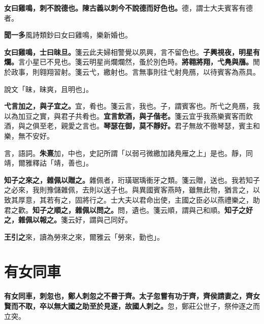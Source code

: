 
\textbf{女曰雞鳴，刺不說德也。陳古義以刺今不說德而好色也。}{\footnotesize 德，謂士大夫賓客有德者。}

\begin{quoting}\textbf{聞一多}風詩類鈔曰女曰雞鳴，樂新婚也。\end{quoting}

\textbf{女曰雞鳴，士曰昧旦。}{\footnotesize 箋云此夫婦相警覺以夙興，言不留色也。}\textbf{子興視夜，明星有爛。}{\footnotesize 言小星已不見也。箋云明星尚爛爛然，蚤於別色時。}\textbf{將翱將翔，弋鳧與鴈。}{\footnotesize 閒於政事，則翱翔習射。箋云弋，繳射也。言無事則往弋射鳧鴈，以待賓客為燕具。}

\begin{quoting}說文「昧，昧爽，且明也」。\end{quoting}

\textbf{弋言加之，與子宜之。}{\footnotesize 宜，肴也。箋云言，我也。子，謂賓客也。所弋之鳧鴈，我以為加豆之實，與君子共肴也。}\textbf{宜言飲酒，與子偕老。}{\footnotesize 箋云宜乎我燕樂賓客而飲酒，與之俱至老，親愛之言也。}\textbf{琴瑟在御，莫不靜好。}{\footnotesize 君子無故不徹琴瑟，賓主和樂，無不安好。}

\begin{quoting}言，語詞。\textbf{朱熹}加，中也，史記所謂「以弱弓微繳加諸鳧雁之上」是也。靜，同靖，爾雅釋詁「靖，善也」。\end{quoting}

\textbf{知子之來之，雜佩以贈之。}{\footnotesize 雜佩者，珩璜琚瑀衝牙之類。箋云贈，送也。我若知子之必來，我則豫儲雜佩，去則以送子也。與異國賓客燕時，雖無此物，猶言之，以致其厚意，其若有之，固將行之。士大夫以君命出使，主國之臣必以燕禮樂之，助君之歡。}\textbf{知子之順之，雜佩以問之。}{\footnotesize 問，遺也。箋云順，謂與己和順。}\textbf{知子之好之，雜佩以報之。}{\footnotesize 箋云好，謂與己同好。}

\begin{quoting}\textbf{王引之}來，讀為勞來之來，爾雅云「勞來，勤也」。\end{quoting}

\section{有女同車}


\textbf{有女同車，刺忽也，鄭人刺忽之不昬于齊。太子忽嘗有功于齊，齊侯請妻之，齊女賢而不取，卒以無大國之助至於見逐，故國人刺之。}{\footnotesize 忽，鄭莊公世子，祭仲逐之而立突。}

